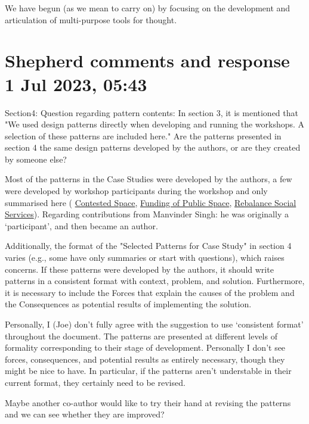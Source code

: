 \documentclass[acmlarge,timestamp]{acmart}
\begin{document}
We have begun (as we mean to carry on) by focusing on the development
and articulation of multi-purpose tools for thought.


\renewcommand\bibname{References}
\renewcommand\refname{References}




\appendix

\section{Shepherd comments and response 1 Jul 2023, 05:43}

\begin{leftbubbles}
\label{Q:developed-by-authors} Section4: Question regarding pattern contents: In section 3, it is mentioned that "We used design patterns directly when developing and running the workshops. A selection of these patterns are included here." Are the patterns presented in section 4 the same design patterns developed by the authors, or are they created by someone else?
\end{leftbubbles}
\begin{rightbubbles}
Most of the patterns in the Case Studies were developed by the
authors, a few were developed by workshop participants during the
workshop and only summarised here ({\sc
  \hyperref[pat:contested-space]{Contested Space}}, {\sc
  \hyperref[pat:funding-of-public-space]{Funding of Public Space}},
{\sc \hyperref[{pat:rebalance-social-services}]{Rebalance Social
    Services}}).  Regarding contributions from Manvinder Singh: he was
originally a ‘participant’, and then became an author.
\end{rightbubbles}

\begin{leftbubbles}
Additionally, the format of the "Selected Patterns for Case Study" in
section 4 varies (e.g., some have only summaries or start with
questions), which raises concerns. If these patterns were developed by
the authors, it should write patterns in a consistent format with
context, problem, and solution. Furthermore, it is necessary to
include the Forces that explain the causes of the problem and the
Consequences as potential results of implementing the solution.
\end{leftbubbles}

\begin{rightbubbles}
Personally, I (Joe) don’t fully agree with the suggestion to use
‘consistent format’ throughout the document.  The patterns are
presented at different levels of formality corresponding to their
stage of development.  Personally I don’t see forces, consequences,
and potential results as entirely necessary, though they might be nice
to have.  In particular, if the patterns aren’t understable in their
current format, they certainly need to be revised.

Maybe another co-author would like to try their hand at revising the
patterns and we can see whether they are improved? {\huge 🤔}
\end{rightbubbles}
\end{document}
